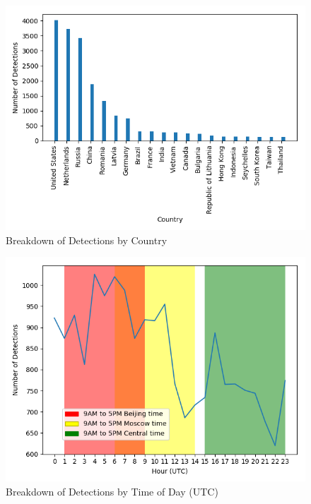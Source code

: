 \documentclass[a0,landscape]{a0poster}
\begin{document}
\begin{multicols}{3}
\begin{figure}[H]
	\begin{center}
		\includegraphics[width=25cm]{top_countries.png}
		\caption{Breakdown of Detections by Country}
	\end{center}
\end{figure} 

\begin{figure}[H]
	\begin{center}
		\includegraphics[width=20cm]{time_breakdown.png}
		\caption{Breakdown of Detections by Time of Day (UTC)}
	\end{center}
\end{figure} 


\end{multicols}
\end{document}
